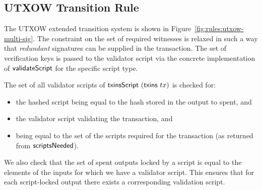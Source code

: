 \documentclass[11pt,a4paper,dvipsnames]{article}
\theoremstyle{definition}
\begin{document}
\subsection{UTXOW Transition Rule}
\label{sec:utxow-transition}

The UTXOW extended transition system is shown in
Figure~\ref{fig:rules:utxow-multi-sig}. The constraint on the set of required
witnesses is relaxed in such a way that \emph{redundant} signatures can be
supplied in the transaction. The set of verification keys is passed to the
validator script via the concrete implementation of $\mathsf{validateScript}$ for
the specific script type.

The set of all validator scripts of $\mathsf{txinsScript}~(\mathsf{txins}~tx)$ is
checked for:

\begin{itemize}
\item the hashed script being equal to the hash stored in the output to spent,
  and
\item the validator script validating the transaction, and
\item being equal to the set of the scripts required for the transaction (as
  returned from $\mathsf{scriptsNeeded}$).
\end{itemize}

We also check that the set of spent outputs locked by a script is equal to the
elements of the inputs for which we have a validator script. This ensures that
for each script-locked output there exists a corresponding validation script.
\end{document}
